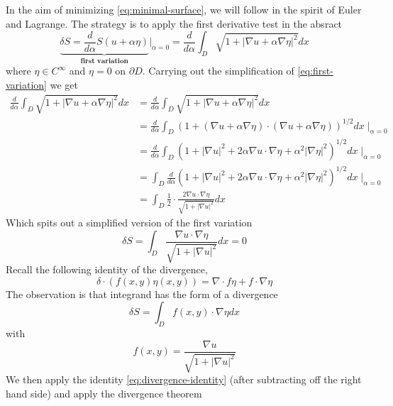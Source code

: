 \documentclass{bkcnotes}
\begin{document}
In the aim of minimizing \eqref{eq:minimal-surface}, we will follow in
the spirit of Euler and Lagrange. The strategy is to apply the
first derivative test in the absract
\begin{equation}
  \label{eq:first-variation}
  \underbrace{\delta S = \frac{d}{d\alpha} S(u + \alpha \eta)}_{\textbf{first variation}} \Big|_{\alpha=0} =
  \frac{d}{d\alpha} \int_D \sqrt{1 + |\nabla u + \alpha \nabla \eta |^2}dx
\end{equation}
where $\eta \in C^{\infty}$ and $\eta = 0$ on $\partial D$. Carrying
out the simplification of \eqref{eq:first-variation} we get
\begin{align*}
  \frac{d}{d \alpha} \int_D \sqrt{1 + | \nabla u + \alpha \nabla \eta
    |^2}dx
  &= \frac{d}{d \alpha} \int_D \sqrt{1 + | \nabla u + \alpha \nabla \eta |^2}dx \\
  &= \frac{d}{d\alpha} \int_D \left( 1 + (\nabla u + \alpha \nabla
    \eta ) \cdot (\nabla u + \alpha \nabla \eta )\right)^{1/2}dx
  \mid_{\alpha=0} \\
  &= \frac{d}{d\alpha} \int_D \left(1 + |\nabla u|^2 + 2\alpha\nabla u
    \cdot \nabla \eta + \alpha^2|\nabla
    \eta|^2\right)^{1/2}dx\mid_{\alpha = 0} \\
  &= \int_D \frac{d}{d\alpha} \left(1 + |\nabla u|^2 + 2\alpha\nabla u
    \cdot
    \nabla \eta + \alpha^2|\nabla \eta|^2\right)^{1/2}dx\mid_{\alpha = 0} \\
  &= \int_D \frac{1}{2} \cdot \frac{2 \nabla u \cdot \nabla
    \eta}{\sqrt{1 + |\nabla u|^2}}dx
\end{align*}
Which spits out a simplified version of the first variation
\begin{equation}
  \label{eq:first-variation-simpl}
  \delta S = \int_D \frac{\nabla u \cdot \nabla \eta}{\sqrt{1 +
      |\nabla u|^2}}dx = 0
\end{equation}
Recall the following identity of the divergence,
\begin{equation}
  \label{eq:divergence-identity}
  \delta \cdot (f(x,y) \eta(x,y)) = \nabla \cdot f \eta + f \cdot \nabla \eta
\end{equation}
The observation is that integrand has the form of a divergence
\begin{equation}
  \label{eq:first-variation-divergence}
  \delta S = \int_D f(x,y) \cdot \nabla \eta dx
\end{equation}
with
\[
f(x,y) = \frac{\nabla u}{\sqrt{1 + |\nabla u|^2}}
\]
We then apply the identity \eqref{eq:divergence-identity} (after
subtracting off the right hand side) and apply the divergence theorem
\end{document}
